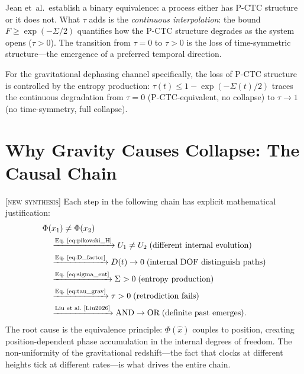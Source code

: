 \documentclass[prl,twocolumn,superscriptaddress,longbibliography,floatfix]{revtex4-2}
\newcommand{\tauasym}{\tau}
\begin{document}
Jean et~al.\ establish a binary equivalence: a process either has
P-CTC structure or it does not.  What $\tauasym$ adds is the
\emph{continuous interpolation}: the bound $F \geq \exp(-\Sigma/2)$
quantifies how the P-CTC structure degrades as the system opens
($\tauasym > 0$).  The transition from $\tauasym = 0$ to
$\tauasym > 0$ is the loss of time-symmetric structure---the
emergence of a preferred temporal direction.

For the gravitational dephasing channel specifically, the loss of
P-CTC structure is controlled by the entropy production:
$\tauasym(t) \leq 1 - \exp(-\Sigma(t)/2)$ traces the continuous
degradation from $\tauasym = 0$ (P-CTC-equivalent, no collapse)
to $\tauasym \to 1$ (no time-symmetry, full collapse).

\section{Why Gravity Causes Collapse: The Causal Chain}
\label{sec:causal_chain}

[\textsc{new synthesis}]  Each step in the following chain has
explicit mathematical justification:
\begin{equation}
\begin{aligned}
&\Phi(x_1) \neq \Phi(x_2) \\
&\quad\xrightarrow{\text{Eq.~\eqref{eq:pikovski_H}}}
  U_1 \neq U_2 \;\text{(different internal evolution)} \\
&\quad\xrightarrow{\text{Eq.~\eqref{eq:D_factor}}}
  D(t) \to 0 \;\text{(internal DOF distinguish paths)} \\
&\quad\xrightarrow{\text{Eq.~\eqref{eq:sigma_ent}}}
  \Sigma > 0 \;\text{(entropy production)} \\
&\quad\xrightarrow{\text{Eq.~\eqref{eq:tau_grav}}}
  \tauasym > 0 \;\text{(retrodiction fails)} \\
&\quad\xrightarrow{\text{Liu et~al.~\cite{Liu2026}}}
  \text{AND} \to \text{OR} \;\text{(definite past emerges)}.
\end{aligned}
\label{eq:causal_chain}
\end{equation}
The root cause is the equivalence principle: $\Phi(\hat{x})$
couples to position, creating position-dependent phase accumulation
in the internal degrees of freedom.  The non-uniformity of the
gravitational redshift---the fact that clocks at different heights
tick at different rates---is what drives the entire chain.
\end{document}
